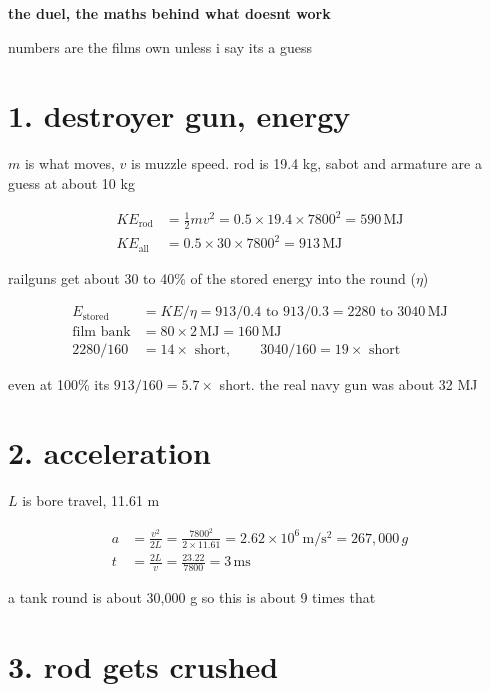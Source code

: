 \documentclass[11pt]{article}
\newcommand{\un}[1]{\,\mathrm{#1}}
\begin{document}
{\Large\bfseries the duel, the maths behind what doesnt work}

\vspace{4pt}
numbers are the films own unless i say its a guess

\section*{1. destroyer gun, energy}

$m$ is what moves, $v$ is muzzle speed. rod is 19.4 kg, sabot and armature are a guess at about 10 kg

\begin{align*}
KE_{\text{rod}} &= \tfrac12 m v^2 = 0.5 \times 19.4 \times 7800^2 = 590\un{MJ}\\
KE_{\text{all}} &= 0.5 \times 30 \times 7800^2 = 913\un{MJ}
\end{align*}

railguns get about 30 to 40\% of the stored energy into the round ($\eta$)

\begin{align*}
E_{\text{stored}} &= KE/\eta = 913/0.4 \text{ to } 913/0.3 = 2280 \text{ to } 3040\un{MJ}\\
\text{film bank} &= 80 \times 2\un{MJ} = 160\un{MJ}\\
2280/160 &= 14\times \text{ short}, \qquad 3040/160 = 19\times \text{ short}
\end{align*}

even at 100\% its $913/160 = 5.7\times$ short. the real navy gun was about 32 MJ

\section*{2. acceleration}

$L$ is bore travel, 11.61 m

\begin{align*}
a &= \frac{v^2}{2L} = \frac{7800^2}{2 \times 11.61} = 2.62\times10^{6}\un{m/s^2} = 267{,}000\,g\\
t &= \frac{2L}{v} = \frac{23.22}{7800} = 3\un{ms}
\end{align*}

a tank round is about 30,000 g so this is about 9 times that

\section*{3. rod gets crushed}
\end{document}
